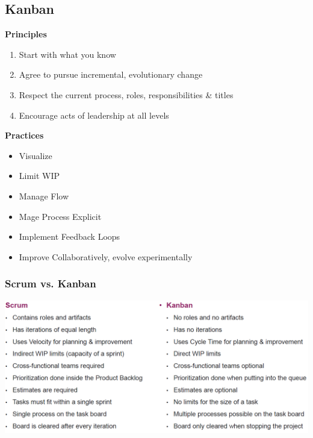 \subsection{Kanban}
\textbf{Principles}
\begin{enumerate}
    \item Start with what you know
    \item Agree to pursue incremental, evolutionary change
    \item Respect the current process, roles, responsibilities \& titles
    \item Encourage acts of leadership at all levels
\end{enumerate}
\textbf{Practices}
\begin{itemize}
    \item Visualize
    \item Limit WIP
    \item Manage Flow
    \item Mage Process Explicit
    \item Implement Feedback Loops
    \item Improve Collaboratively, evolve experimentally
\end{itemize}

\subsubsection{Scrum vs. Kanban}
\includegraphics[width=\linewidth]{../img/scrum_vs_kanban.png}